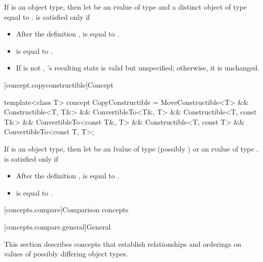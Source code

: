 \begin{itemdescr}
\pnum
If  is an object type, then let  be an rvalue of type
 and  a distinct object of type  equal to
.  is satisfied only if

\begin{itemize}
\item After the definition ,  is equal to .

\item {} is equal to .

\item If  is not , 's resulting state is valid
but unspecified; otherwise, it is unchanged.
\end{itemize}
\end{itemdescr}

[concept.copyconstructible]{Concept }

%
\begin{itemdecl}
template<class T>
concept CopyConstructible = MoveConstructible<T> &&
  Constructible<T, T&> && ConvertibleTo<T&, T> &&
  Constructible<T, const T&> && ConvertibleTo<const T&, T> &&
  Constructible<T, const T> && ConvertibleTo<const T, T>;
\end{itemdecl}

\begin{itemdescr}
\pnum
If  is an object type, then let  be an lvalue of type
(possibly )  or an rvalue of type .
 is satisfied only if

\begin{itemize}
\item After the definition ,  is equal to .

\item {} is equal to .
\end{itemize}

\end{itemdescr}

[concepts.compare]{Comparison concepts}

[concepts.compare.general]{General}

\pnum
This section describes concepts that establish relationships and orderings
on values of possibly differing object types.

